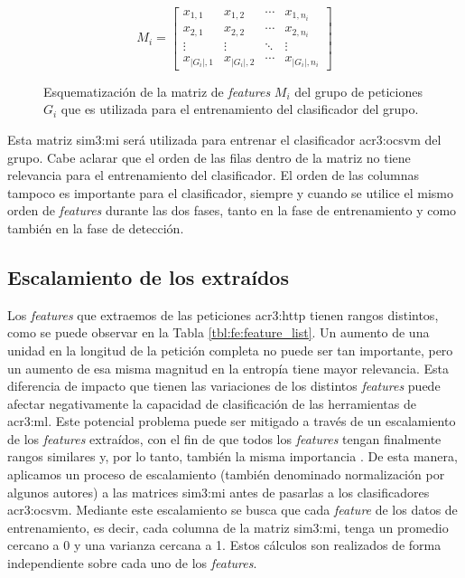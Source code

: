 \begin{figure}[ht]
    $$
    M_{i} =
    \begin{bmatrix}
        x_{1,1}                    & x_{1,2}                    & \cdots & x_{1,n_{i}} \\
        x_{2,1}                    & x_{2,2}                    & \cdots & x_{2,n_{i}} \\
        \vdots                     & \vdots                     & \ddots & \vdots      \\
        x_{\lvert G_{i} \rvert, 1} & x_{\lvert G_{i} \rvert, 2} & \cdots & x_{\lvert G_{i} \rvert, n_{i}}
    \end{bmatrix}
    $$

    \caption{Esquematización de la matriz de \textit{features} $M_{i}$ del
        grupo de peticiones $G_{i}$ que es utilizada para el entrenamiento
        del clasificador del grupo.}
    \label{fig:fe:matrix_m}
\end{figure}

Esta matriz \gls{sim3:mi} será utilizada para entrenar el
clasificador \gls{acr3:ocsvm} del grupo. Cabe aclarar que el orden de las filas
dentro de la matriz no tiene relevancia para el entrenamiento del clasificador.
El orden de las columnas tampoco es importante para el clasificador,
siempre y cuando se utilice el mismo orden de \textit{features} durante
las dos fases, tanto en la fase de entrenamiento y como también en la
fase de detección.


\subsection{Escalamiento de los \features extraídos}

Los \textit{features} que extraemos de las peticiones \gls{acr3:http}
tienen rangos distintos, como se puede observar en la
Tabla \ref{tbl:fe:feature_list}.
Un aumento de una unidad en la longitud de la petición completa no puede
ser tan importante, pero un aumento de esa misma magnitud en la entropía
tiene mayor relevancia. Esta diferencia de impacto que tienen las variaciones
de los distintos \textit{features} puede afectar negativamente la capacidad
de clasificación de las herramientas de \gls{acr3:ml}. Este potencial
problema puede ser mitigado a través de un escalamiento de los \textit{features}
extraídos, con el fin de que todos los \textit{features} tengan finalmente
rangos similares y, por lo tanto, también la misma importancia
\cite{rieck2009machine}. %
De esta manera, aplicamos un proceso de escalamiento (también
denominado normalización por algunos autores) a las matrices
\gls{sim3:mi} antes de pasarlas a los clasificadores \gls{acr3:ocsvm}.
Mediante este escalamiento se busca que cada \textit{feature}
de los datos de entrenamiento, es decir, cada columna de
la matriz \gls{sim3:mi}, tenga un promedio cercano a 0 y una varianza
cercana a 1. Estos cálculos son realizados de forma independiente sobre
cada uno de los \textit{features}.

